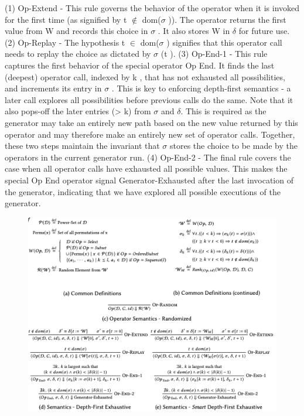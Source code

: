 \documentclass{article}
\begin{document}
(1) Op-Extend - This rule governs the behavior of the operator when it is invoked for the first time (as signified by t $\notin$ dom($\sigma$ )). The operator returns the first value from W and records this choice in $\sigma$  . It also stores W in  $\delta$ for future use.
(2) Op-Replay - The hypothesis t $\in$ dom($\sigma$  ) signifies that this operator call needs to replay the choice as dictated by $\sigma$ (t ).
(3) Op-End-1 - This rule captures the first behavior of the special operator Op End. It finds the last (deepest) operator call, indexed by k , that has not exhausted all possibilities, and increments its entry in $\sigma$  . This is key to enforcing depth-first semantics - a later call explores all possibilities before previous calls do the same. Note that it also pops-off the later entries (> k) from $\sigma$  and $\delta$. This is required as the generator may take an entirely new path based on the new value returned by this operator and may therefore make an entirely new set of operator calls. Together, these two steps maintain the invariant that $\sigma$  stores the choice to be made by the operators in the current generator run.
(4) Op-End-2 - The final rule covers the case when all operator calls have exhausted all possible values. This makes the special Op End operator signal Generator-Exhausted after the last invocation of the generator, indicating that we have explored all possible executions of the generator.

\begin{figure}[ht]
\vskip 0.2in
\begin{center}
\centerline{\includegraphics[width=\columnwidth]{Images/Synthesis3-2.png}}
\label{icml-historical}
\end{center}
\vskip -0.2in
\end{figure}
\end{document}
